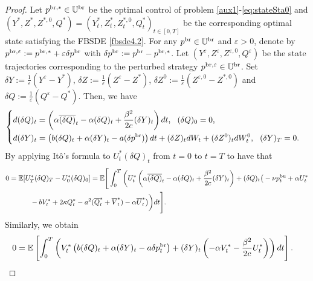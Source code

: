 \documentclass[11pt]{article}
\numberwithin{equation}{section}
\begin{document}
\begin{proof}	
Let $p^{{\rm br},*}\in\mathbb{U}^{\rm br}$ be the optimal control of problem \eqref{aux1}-\eqref{eq:stateSta0} and $(Y^*, Z^*,Z^{*,0},Q^*)=(Y_t^*, Z_t^*,Z_t^{*,0}, Q_t^*)_{t\in [0, T]}$ be the corresponding optimal state satisfying the FBSDE \eqref{fbsde4.2}. For any $p^{{\rm br}}\in\mathbb{U}^{\rm br}$ and $\varepsilon>0$, denote by $p^{{\rm br}, \varepsilon}:=p^{{\rm br},*}+\varepsilon \delta p^{{\rm br}}$ with $\delta p^{{\rm br}}:=p^{{\rm br}}-p^{{\rm br},*}$. Let $( Y^{\varepsilon}, Z^{\varepsilon},Z^{\varepsilon,0},Q^{\varepsilon})$ be the state trajectories corresponding to the perturbed strategy $p^{{\rm br}, \varepsilon}\in\mathbb{U}^{\rm br}$. Set $\delta Y:=\frac{1}{\varepsilon}(Y^{\varepsilon}-Y^*)$, $\delta Z:=\frac{1}{\varepsilon}(Z^{\varepsilon}-Z^*)$, $\delta Z^0:=\frac{1}{\varepsilon}(Z^{\varepsilon,0}-Z^{*,0})$ and $\delta Q:=\frac{1}{\varepsilon}(Q^{\varepsilon}-Q^*)$. Then, we have 
\begin{align*}
\begin{cases}
\displaystyle d(\delta Q)_t=\left(\alpha \overline{(\delta Q)}_t-\alpha(\delta Q)_t+\frac{\beta^2}{2c}(\delta Y)_t\right)dt,~~(\delta Q)_0=0,\\[0.8em]
\displaystyle d(\delta Y)_t=\left(b(\delta Q)_t+\alpha (\delta Y)_t-a(\delta p^{{\rm br}})\right)dt+(\delta Z)_tdW_t+(\delta Z^0)_tdW_t^0,~~(\delta Y)_T=0.\\
\end{cases}
\end{align*}
By applying It\^o's formula to $U_t^*(\delta Q)_t$ from $t=0$ to $t=T$ to have that
\begin{align}\label{ito1}
0&=\mathbb{E}[U_T^*(\delta Q)_T-U_0^*(\delta Q)_0]=\mathbb{E}\Bigg[\int_0^T\bigg(U_t^*\left(\alpha \overline{(\delta Q)}_t-\alpha (\delta Q)_t+\frac{\beta^2}{2c}(\delta Y)_t\right)+(\delta Q)_t\big(-\nu p_t^{{\rm bu}}+\alpha U_t^*\nonumber\\
&\qquad\quad-bV_t^*+2\kappa Q_t^*-a^2(\overline{Q}_t^*+\overline{V}_t^*)-\alpha \overline{U}_t^*\big)\bigg)dt\Bigg].
\end{align}
Similarly, we obtain
\begin{align}\label{ito2}
0%
&=\mathbb{E}\left[\int_0^T\left(V_t^*\left(b(\delta Q)_t+\alpha (\delta Y)_t-a\delta p_t^{{\rm br}}\right)+(\delta Y)_t\left(-\alpha V_t^*-\frac{\beta^2}{2c} U_t^*\right)\right)dt\right].
\end{align}

\end{proof}
\end{document}
